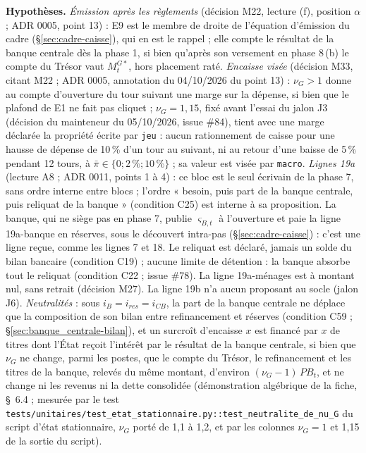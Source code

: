 \documentclass[11pt,a4paper]{article}
\newcommand{\hyp}{\par\noindent\textbf{Hypothèses.} }
\begin{document}
\begin{proposee}
\hyp \emph{Émission après les règlements} (décision M22, lecture (f), position $\alpha$ ; ADR 0005, point 13) : E9 est le membre de droite de l'équation d'émission du cadre (\S\ref{sec:cadre-caisse}), qui en est le rappel ; elle compte le résultat de la banque centrale dès la phase 1, si bien qu'après son versement en phase 8\,(b) le compte du Trésor vaut $M^{G*}_t$, hors placement raté. \emph{Encaisse visée} (décision M33, citant M22 ; ADR 0005, annotation du 04/10/2026 du point 13) : $\nu_G > 1$ donne au compte d'ouverture du tour suivant une marge sur la dépense, si bien que le plafond de E1 ne fait pas cliquet ; $\nu_G = 1{,}15$, fixé avant l'essai du jalon J3 (décision du mainteneur du 05/10/2026, issue \#84), tient avec une marge déclarée la propriété écrite par \texttt{jeu} : aucun rationnement de caisse pour une hausse de dépense de 10\,\% d'un tour au suivant, ni au retour d'une baisse de 5\,\% pendant 12 tours, à $\bar\pi \in \{0 ; 2\,\% ; 10\,\%\}$ ; sa valeur est visée par \texttt{macro}. \emph{Lignes 19a} (lecture A8 ; ADR 0011, points 1 à 4) : ce bloc est le seul écrivain de la phase 7, sans ordre interne entre blocs ; l'ordre « besoin, puis part de la banque centrale, puis reliquat de la banque » (condition C25) est interne à sa proposition. La banque, qui ne siège pas en phase 7, publie $\varsigma_{B,t}$ à l'ouverture et paie la ligne 19a-banque en réserves, sous le découvert intra-pas (\S\ref{sec:cadre-caisse}) : c'est une ligne reçue, comme les lignes 7 et 18. Le reliquat est déclaré, jamais un solde du bilan bancaire (condition C19) ; aucune limite de détention : la banque absorbe tout le reliquat (condition C22 ; issue \#78). La ligne 19a-ménages est à montant nul, sans retrait (décision M27). La ligne 19b n'a aucun proposant au socle (jalon J6). \emph{Neutralités} : sous $i_B = i_{\mathit{res}} = i_{\mathit{CB}}$, la part de la banque centrale ne déplace que la composition de son bilan entre refinancement et réserves (condition C59 ; \S\ref{sec:banque_centrale-bilan}), et un surcroît d'encaisse $x$ est financé par $x$ de titres dont l'État reçoit l'intérêt par le résultat de la banque centrale, si bien que $\nu_G$ ne change, parmi les postes, que le compte du Trésor, le refinancement et les titres de la banque, relevés du même montant, d'environ $(\nu_G - 1)\,\mathit{PB}_t$, et ne change ni les revenus ni la dette consolidée (démonstration algébrique de la fiche, \S~6.4 ; mesurée par le test \nolinkurl{tests/unitaires/test_etat_stationnaire.py::test_neutralite_de_nu_G} du script d'état stationnaire, $\nu_G$ porté de 1,1 à 1,2, et par les colonnes $\nu_G = 1$ et 1,15 de la sortie du script).

\end{proposee}
\end{document}
